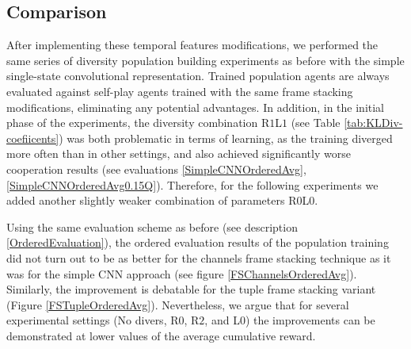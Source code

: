 \subsection{Comparison}
After implementing these temporal features modifications, we performed the same series of diversity population building experiments as before with the simple single-state convolutional representation.
Trained population agents are always evaluated against self-play agents trained with the same frame stacking modifications, eliminating any potential advantages.
In addition, in the initial phase of the experiments, the diversity combination R$1$L$1$ (see Table \ref{tab:KLDiv-coefiicents}) was both problematic in terms of learning, as the training diverged more often than in other settings, and also achieved significantly worse cooperation results (see evaluations \ref{SimpleCNNOrderedAvg}, \ref{SimpleCNNOrderedAvg0.15Q}).
Therefore, for the following experiments we added another slightly weaker combination of parameters R$0$L$0$.

Using the same evaluation scheme as before (see description \ref{OrderedEvaluation}), the ordered evaluation results of the population training did not turn out to be as better for the channels frame stacking technique as it was for the simple CNN approach (see figure \ref{FSChannelsOrderedAvg}).
Similarly, the improvement is debatable for the tuple frame stacking variant (Figure \ref{FSTupleOrderedAvg}).
Nevertheless, we argue that for several experimental settings (No divers, R$0$, R$2$, and L$0$) the improvements can be demonstrated at lower values of the average cumulative reward.

